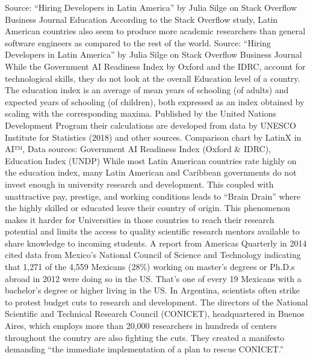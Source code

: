 \documentclass[journal]{IEEEtran}
\begin{document}
Source: “Hiring Developers in Latin America” by Julia Silge on Stack Overflow Business Journal
Education
According to the Stack Overflow study, Latin American countries also seem to produce more academic researchers than general software engineers as compared to the rest of the world.
Source: “Hiring Developers in Latin America” by Julia Silge on Stack Overflow Business Journal
While the Government AI Readiness Index by Oxford and the IDRC, account for technological skills, they do not look at the overall Education level of a country. The education index is an average of mean years of schooling (of adults) and expected years of schooling (of children), both expressed as an index obtained by scaling with the corresponding maxima. Published by the United Nations Development Program their calculations are developed from data by UNESCO Institute for Statistics (2018) and other sources.
Comparison chart by LatinX in AI™, Data sources: Government AI Readiness Index (Oxford \& IDRC), Education Index (UNDP)
While most Latin American countries rate highly on the education index, many Latin American and Caribbean governments do not invest enough in university research and development. This coupled with unattractive pay, prestige, and working conditions leads to “Brain Drain” where the highly skilled or educated leave their country of origin. This phenomenon makes it harder for Universities in those countries to reach their research potential and limits the access to quality scientific research mentors available to share knowledge to incoming students.
A report from Americas Quarterly in 2014 cited data from Mexico’s National Council of Science and Technology indicating that 1,271 of the 4,559 Mexicans (28\%) working on master’s degrees or Ph.D.s abroad in 2012 were doing so in the US. That’s one of every 19 Mexicans with a bachelor’s degree or higher living in the US.
In Argentina, scientists often strike to protest budget cuts to research and development. The directors of the National Scientific and Technical Research Council (CONICET), headquartered in Buenos Aires, which employs more than 20,000 researchers in hundreds of centers throughout the country are also fighting the cuts. They created a manifesto demanding “the immediate implementation of a plan to rescue CONICET.”
\end{document}
